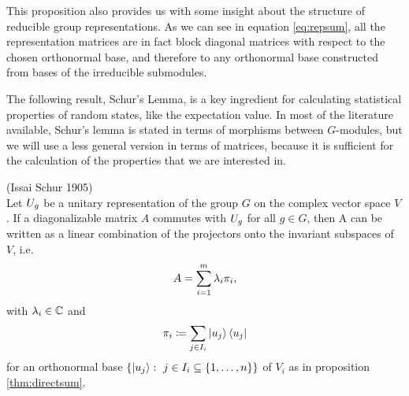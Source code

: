 \documentclass[a4paper,11pt, BCOR=4mm, DIV=12, pagesize]{scrartcl}
\begin{document}
This proposition also provides us with some insight about the structure of 
reducible group representations. As we can see in equation \ref{eq:repsum}, all 
the representation matrices are in fact block diagonal matrices with respect to 
the chosen orthonormal base, and therefore to any orthonormal base constructed 
from bases of the irreducible submodules.

The following result, Schur's Lemma, is a key ingredient for calculating 
statistical properties of random states, like the expectation value. In most of 
the literature  available, Schur's lemma is stated in terms of 
morphisms between $G$-modules, but we will use a less general version in 
terms of matrices, because it is sufficient for the calculation of the 
properties that we are interested in. 

\begin{lemma}(Issai Schur 1905)\label{lemma:schur}\\
Let $U_{g}$ be a unitary 
 representation of the group $G$ on the complex vector space $V$. If a 
 diagonalizable matrix $A$ commutes with  $U_{g}$ 
 for all $g\in G$, then A can be written as a linear combination of the 
projectors onto the invariant subspaces of $V$, i.e. 
 \begin{equation}
  A = \sum\limits_{i=1}^{m} \lambda_i \pi_i,
 \end{equation}
 with $\lambda_i\in\mathbb{C}$ and 
 \begin{equation}
  \pi_i \coloneqq \sum\limits_{j\in I_i} \ket{u_j}\bra{u_j}
 \end{equation}
 for an orthonormal base $\left\{\ket{u_j}:\ j\in I_i\subseteq 
\left\{1,\ldots,n\right\}\right\}$ of $V_i$ as in proposition 
\ref{thm:directsum}.
\end{lemma}
\end{document}
